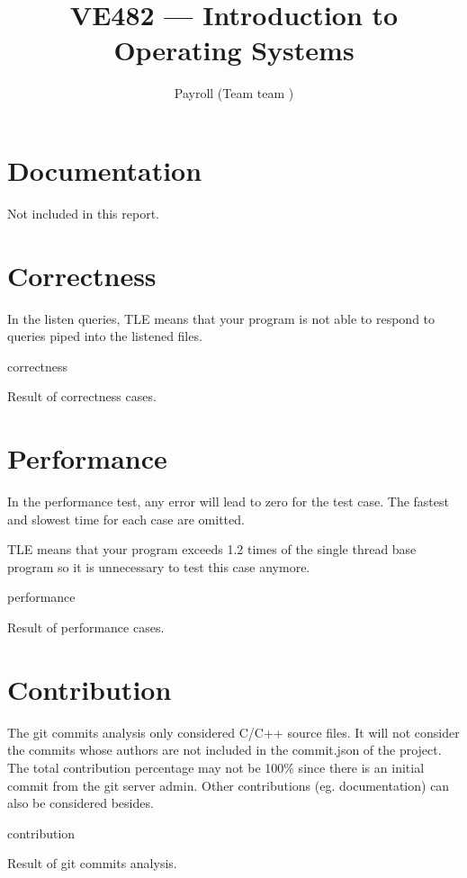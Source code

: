 \documentclass[landscape]{article}
\title{VE482 --- Introduction to\\ Operating Systems}
\subtitle{Payroll (Team {{ team }})}
\begin{document}
\maketitle

\section{Documentation}

Not included in this report.

\section{Correctness}

In the listen queries, {\color{red}TLE} means that your program is not able to respond to queries piped into the listened files.

\begin{table}[!htbp]
\centering
{{ correctness }}
\caption{Result of correctness cases.}
\end{table}

\newpage

\section{Performance}

In the performance test, any error will lead to zero for the test case. The fastest and slowest time for each case are omitted.

{\color{red}TLE} means that your program exceeds 1.2 times of the single thread base program so it is unnecessary to test this case anymore.

\begin{table}[!htbp]
\centering
{{ performance }}
\caption{Result of performance cases.}
\end{table}

\section{Contribution}

The git commits analysis only considered C/C++ source files. It will not consider the commits whose authors are not included in the commit.json of the project. 
The total contribution percentage may not be 100\% since there is an initial commit from the git server admin.
Other contributions (eg. documentation) can also be considered besides.

\begin{table}[!htbp]
\centering
{{ contribution }}
\caption{Result of git commits analysis.}
\end{table}
\end{document}
